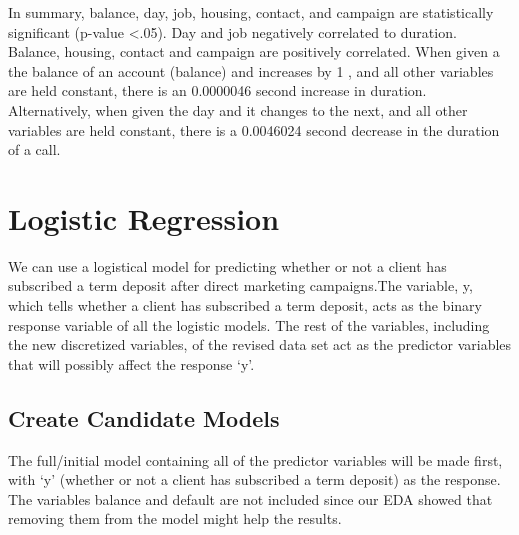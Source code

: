 \documentclass[
]{article}
\newenvironment{Shaded}{\begin{snugshade}}{\end{snugshade}}
\newcommand{\AttributeTok}[1]{\textcolor[rgb]{0.13,0.29,0.53}{#1}}
\newcommand{\CommentTok}[1]{\textcolor[rgb]{0.56,0.35,0.01}{\textit{#1}}}
\newcommand{\FunctionTok}[1]{\textcolor[rgb]{0.13,0.29,0.53}{\textbf{#1}}}
\newcommand{\NormalTok}[1]{#1}
\newcommand{\OtherTok}[1]{\textcolor[rgb]{0.56,0.35,0.01}{#1}}
\newcommand{\SpecialCharTok}[1]{\textcolor[rgb]{0.81,0.36,0.00}{\textbf{#1}}}
\newcommand{\StringTok}[1]{\textcolor[rgb]{0.31,0.60,0.02}{#1}}
\begin{document}
In summary, balance, day, job, housing, contact, and campaign are
statistically significant (p-value \textless.05). Day and job negatively
correlated to duration. Balance, housing, contact and campaign are
positively correlated. When given a the balance of an account (balance)
and increases by 1 , and all other variables are held constant, there is
an 0.0000046 second increase in duration. Alternatively, when given the
day and it changes to the next, and all other variables are held
constant, there is a 0.0046024 second decrease in the duration of a
call.

\section{Logistic Regression}\label{logistic-regression}

We can use a logistical model for predicting whether or not a client has
subscribed a term deposit after direct marketing campaigns.The variable,
y, which tells whether a client has subscribed a term deposit, acts as
the binary response variable of all the logistic models. The rest of the
variables, including the new discretized variables, of the revised data
set act as the predictor variables that will possibly affect the
response `y'.

\subsection{Create Candidate Models}\label{create-candidate-models-1}

The full/initial model containing all of the predictor variables will be
made first, with `y' (whether or not a client has subscribed a term
deposit) as the response. The variables balance and default are not
included since our EDA showed that removing them from the model might
help the results.

\begin{Shaded}
\end{Shaded}
\end{document}
